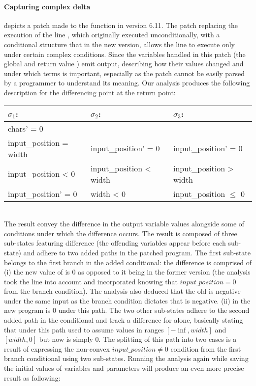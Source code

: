 \paragraph{Capturing complex delta}



 depicts a patch made to the  function in version 6.11. The patch replacing the execution of the line , which originally executed unconditionally, with a conditional structure that in the new version, allows the line to execute only under certain complex conditions. Since the variables handled in this patch (the global  and return value ) emit output, describing how their values changed and under which terms is important, especially as the patch cannot be easily parsed by a programmer to understand its meaning. Our analysis produces the following description for the differencing point at the return point:
\\
\begin{tabular}{l|l|l}
$\sigma_1$:                 & $\sigma_2$:                   & $\sigma_3$:
\\ \hline
chars' = 0                &                               &
\\
input\_position = width   & input\_position' = 0        & input\_position' = 0
\\
input\_position < 0       & input\_position < width     & input\_position > width
\\
input\_position' = 0      & width < 0                   & input\_position $\leq$ 0
\\ \hline
\end{tabular}
\\
The result convey the difference in the output variable values alongside some of conditions under which the difference occurs. The result is composed of three sub-states featuring difference (the offending variables appear before each sub-state) and adhere to two added paths in the patched program. The first sub-state belongs to the first branch in the added conditional: the difference is comprised of (i) the new value of  is 0 as opposed to it being  in the former version (the analysis took the  line into account and incorporated knowing that $input\_position = 0$ from the branch condition). The analysis also deduced that the old  is negative under the same input as the branch condition dictates that  is negative. (ii)  in the new program is 0 under this path. The two other sub-states adhere to the second added path in the conditional and track a difference for  alone, basically stating that  under this path used to assume values in ranges $[-\inf,width]$ and $[width,0]$ but now is simply 0. The splitting of this path into two cases is a result of expressing the non-convex $input\_position \neq 0$ condition from the first branch conditional using two sub-states. Running the analysis again while saving the initial values of variables and parameters will produce an even more precise result as following:
